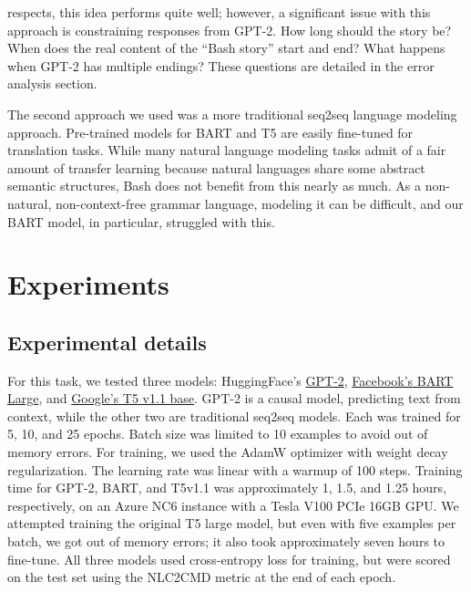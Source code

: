 \documentclass{article}
\begin{document}
respects, this idea performs quite well; however, a significant issue with this
approach is constraining responses from GPT-2. How long should the story be?
When does the real content of the ``Bash story'' start and end? What happens
when GPT-2 has multiple endings? These questions are detailed in the error
analysis section.
\par
The second approach we used was a more traditional seq2seq language modeling
approach. Pre-trained models for BART and T5 are easily fine-tuned for
translation tasks. While many natural language modeling tasks admit of a fair
amount of transfer learning because natural languages share some abstract
semantic structures, Bash does not benefit from this nearly as much. As a
non-natural, non-context-free grammar language, modeling it can be difficult,
and our BART model, in particular, struggled with this.

\section{Experiments}


\subsection{Experimental details}
For this task, we tested three models: HuggingFace's
\href{https://huggingface.co/GPT-2}{GPT-2}\cite{GPT-2},
\href{https://huggingface.co/facebook/bart-large}{Facebook's BART
	Large}\cite{bart}, and \href{https://huggingface.co/google/t5-v1_1-base}{Google's T5 v1.1
  base}. GPT-2 is a causal model, predicting text from context, while the other
  two are traditional seq2seq models. Each was trained for 5, 10, and 25
  epochs. Batch size was limited to 10 examples to avoid out of memory errors.
  For training, we used the AdamW optimizer with weight decay regularization.
  The learning rate was linear with a warmup of 100 steps. Training time for
  GPT-2, BART, and T5v1.1 was approximately 1, 1.5, and 1.25 hours,
  respectively, on an Azure NC6 instance with a Tesla V100 PCIe 16GB GPU. We
  attempted training the original T5 large model, but even with five examples per
  batch, we got out of memory errors; it also took approximately seven hours to
  fine-tune. All three models used cross-entropy loss for training, but were scored
  on the test set using the NLC2CMD metric at the end of each epoch.
\end{document}
